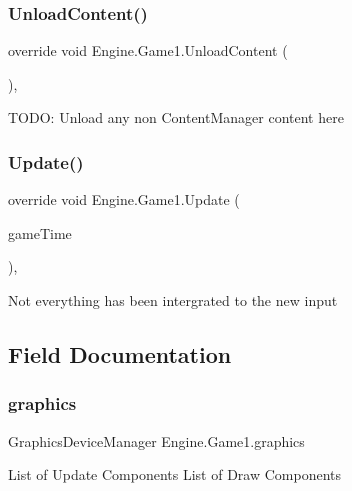 \subsubsection{\texorpdfstring{Unload\+Content()}{UnloadContent()}}
{\footnotesize\ttfamily override void Engine.\+Game1.\+Unload\+Content (\begin{DoxyParamCaption}{ }\end{DoxyParamCaption})\hspace{0.3cm}{\ttfamily [inline]}, {\ttfamily [protected]}}

T\+O\+DO\+: Unload any non Content\+Manager content here \mbox{\label{a00040_a5ec7bcee1272c1a62a77292cd95d043f}} 
\subsubsection{\texorpdfstring{Update()}{Update()}}
{\footnotesize\ttfamily override void Engine.\+Game1.\+Update (\begin{DoxyParamCaption}\item[{Game\+Time}]{game\+Time }\end{DoxyParamCaption})\hspace{0.3cm}{\ttfamily [inline]}, {\ttfamily [protected]}}

Not everything has been intergrated to the new input 

\subsection{Field Documentation}
\mbox{\label{a00040_a6080a5540f79b78b6604cba45c3e0817}} 
\subsubsection{\texorpdfstring{graphics}{graphics}}
{\footnotesize\ttfamily Graphics\+Device\+Manager Engine.\+Game1.\+graphics}

List of Update Components List of Draw Components \mbox{\label{a00040_a6edc487a30ce1f26309e430b29e25f72}} 
